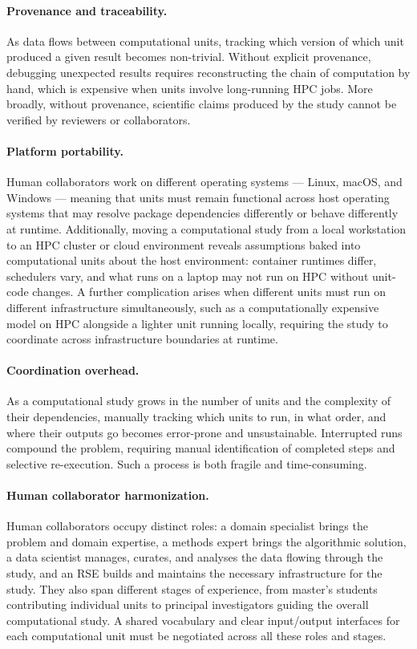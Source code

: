 \documentclass{eceasst}
\begin{document}
\paragraph{Provenance and traceability.}
As data flows between computational units, tracking which version of which unit
produced a given result becomes non-trivial. Without explicit provenance,
debugging unexpected results requires reconstructing the chain of computation
by hand, which is expensive when units involve
long-running HPC jobs. More broadly, without provenance, scientific claims
produced by the study cannot be verified by reviewers or collaborators.

\paragraph{Platform portability.}
Human collaborators work on different operating systems — Linux, macOS, and
Windows — meaning that units must remain functional across host operating systems
that may resolve package dependencies differently or behave differently at runtime.
Additionally, moving a computational study from a local workstation to an HPC
cluster or cloud environment reveals assumptions baked into computational units
about the host environment: container runtimes differ, schedulers vary, and what
runs on a laptop may not run on HPC without unit-code changes. A further
complication arises when different units must run on different infrastructure
simultaneously, such as a computationally expensive model on HPC alongside a
lighter unit running locally, requiring the study to coordinate across
infrastructure boundaries at runtime.

\paragraph{Coordination overhead.}
As a computational study grows in the number of units and the complexity of their
dependencies, manually tracking which units to run, in what order, and where their
outputs go becomes error-prone and unsustainable. Interrupted runs compound the problem, 
requiring manual identification of completed steps and selective re-execution. 
Such a process is both fragile and time-consuming.

\paragraph{Human collaborator harmonization.}
Human collaborators occupy distinct roles: a domain specialist brings the problem and domain expertise, a methods expert brings the algorithmic solution, a data scientist manages, curates, and analyses the data flowing through the study, and an RSE builds and maintains the necessary infrastructure for the study. They also span different stages of experience, from master's students contributing individual units to principal investigators guiding the overall computational study. A shared vocabulary and clear input/output interfaces for each computational unit must be negotiated across all these roles and stages.
\end{document}
